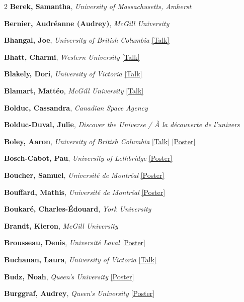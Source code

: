 \begin{small}
\begin{multicols}{2}
\textbf{Berek, Samantha}, {\footnotesize\textit{University of Massachusetts, Amherst}}\par
\textbf{Bernier, Audréanne (Audrey)}, {\footnotesize\textit{McGill University}}\par
\textbf{Bhangal, Joe}, {\footnotesize\textit{University of British Columbia}} \hyperref[abstract-page-talk-136]{\scriptsize\textcolor{cascablue}{[Talk]}}\par
\textbf{Bhatt, Charmi}, {\footnotesize\textit{Western University}} \hyperref[abstract-page-talk-326]{\scriptsize\textcolor{cascablue}{[Talk]}}\par
\textbf{Blakely, Dori}, {\footnotesize\textit{University of Victoria}} \hyperref[abstract-page-talk-31]{\scriptsize\textcolor{cascablue}{[Talk]}}\par
\textbf{Blamart, Mattéo}, {\footnotesize\textit{McGill University}} \hyperref[abstract-page-talk-251]{\scriptsize\textcolor{cascablue}{[Talk]}}\par
\textbf{Bolduc, Cassandra}, {\footnotesize\textit{Canadian Space Agency}}\par
\textbf{Bolduc-Duval, Julie}, {\footnotesize\textit{Discover the Universe / À la découverte de l'univers}}\par
\textbf{Boley, Aaron}, {\footnotesize\textit{University of British Columbia}} \hyperref[abstract-page-talk-305]{\scriptsize\textcolor{cascablue}{[Talk]}} \hyperref[poster-abstract-page-talk-303]{\scriptsize\textcolor{cascateal}{[Poster]}}\par
\textbf{Bosch-Cabot, Pau}, {\footnotesize\textit{University of Lethbridge}} \hyperref[poster-abstract-page-talk-36]{\scriptsize\textcolor{cascateal}{[Poster]}}\par
\textbf{Boucher, Samuel}, {\footnotesize\textit{Université de Montréal}} \hyperref[poster-abstract-page-talk-237]{\scriptsize\textcolor{cascateal}{[Poster]}}\par
\textbf{Bouffard, Mathis}, {\footnotesize\textit{Université de Montréal}} \hyperref[poster-abstract-page-talk-53]{\scriptsize\textcolor{cascateal}{[Poster]}}\par
\textbf{Boukaré, Charles-Édouard}, {\footnotesize\textit{York University}}\par
\textbf{Brandt, Kieron}, {\footnotesize\textit{McGill University}}\par
\textbf{Brousseau, Denis}, {\footnotesize\textit{Université Laval}} \hyperref[poster-abstract-page-talk-219]{\scriptsize\textcolor{cascateal}{[Poster]}}\par
\textbf{Buchanan, Laura}, {\footnotesize\textit{University of Victoria}} \hyperref[abstract-page-talk-244]{\scriptsize\textcolor{cascablue}{[Talk]}}\par
\textbf{Budz, Noah}, {\footnotesize\textit{Queen's University}} \hyperref[poster-abstract-page-talk-190]{\scriptsize\textcolor{cascateal}{[Poster]}}\par
\textbf{Burggraf, Audrey}, {\footnotesize\textit{Queen's University}} \hyperref[poster-abstract-page-talk-302]{\scriptsize\textcolor{cascateal}{[Poster]}}\par


\end{multicols}
\end{small}
